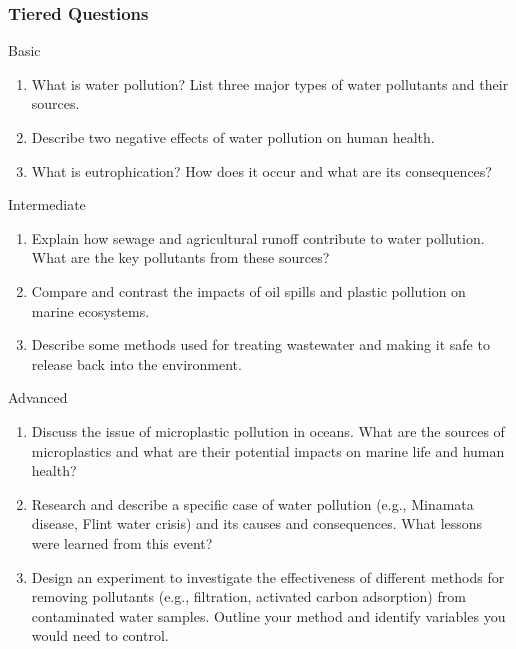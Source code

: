 \subsubsection{Tiered Questions}
\begin{tieredquestions}{Basic}
\begin{enumerate}
    \item What is water pollution? List three major types of water pollutants and their sources.
    \item Describe two negative effects of water pollution on human health.
    \item What is eutrophication? How does it occur and what are its consequences?
\end{enumerate}
\end{tieredquestions}

\begin{tieredquestions}{Intermediate}
\begin{enumerate}
    \item Explain how sewage and agricultural runoff contribute to water pollution. What are the key pollutants from these sources?
    \item Compare and contrast the impacts of oil spills and plastic pollution on marine ecosystems.
    \item Describe some methods used for treating wastewater and making it safe to release back into the environment.
\end{enumerate}
\end{tieredquestions}

\begin{tieredquestions}{Advanced}
\begin{enumerate}
    \item Discuss the issue of microplastic pollution in oceans. What are the sources of microplastics and what are their potential impacts on marine life and human health?
    \item Research and describe a specific case of water pollution (e.g., Minamata disease, Flint water crisis) and its causes and consequences. What lessons were learned from this event?
    \item Design an experiment to investigate the effectiveness of different methods for removing pollutants (e.g., filtration, activated carbon adsorption) from contaminated water samples. Outline your method and identify variables you would need to control.
\end{enumerate}
\end{tieredquestions}

